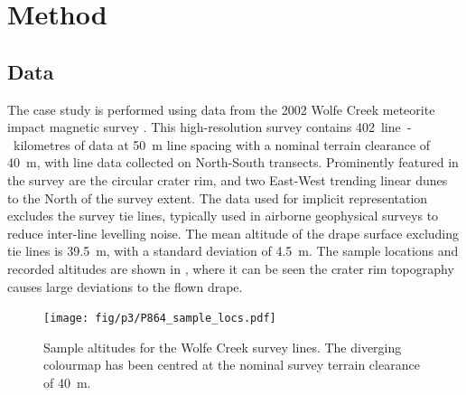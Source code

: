 \documentclass[manuscript.tex]{subfiles}
\begin{document}
\section{Method}

\subsection{Data}
The case study is performed using data from the 2002 Wolfe Creek meteorite impact magnetic survey \parencite{wolfecreek2019}.
This high-resolution survey contains \qty{402}{line-kilometres} of data at \qty{50}{\m} line spacing with a nominal terrain clearance of \qty{40}{\m}, with line data collected on North-South transects.
Prominently featured in the survey are the circular crater rim, and two East-West trending linear dunes to the North of the survey extent.
The data used for implicit representation excludes the survey tie lines, typically used in airborne geophysical surveys to reduce inter-line levelling noise.
The mean altitude of the drape surface excluding tie lines is \qty{39.5}{\m}, with a standard deviation of \qty{4.5}{\m}.
The sample locations and recorded altitudes are shown in , where it can be seen the crater rim topography causes large deviations to the flown drape.

\begin{figure}[hbt]
    \centering{}
    \texttt{[image: fig/p3/P864\_sample\_locs.pdf]}
    \caption[Point samples]{Sample altitudes for the Wolfe Creek survey lines. The diverging colourmap has been centred at the nominal survey terrain clearance of \qty{40}{\m}.}
    \label{fig:samples}
\end{figure}
\end{document}
